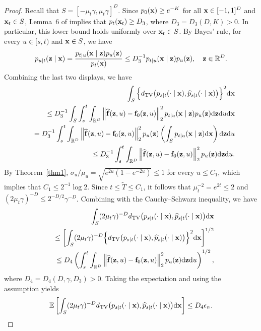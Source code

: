 \documentclass[11pt,a4paper,final]{article}
\numberwithin{equation}{section}
\theoremstyle{remark}
\newcommand{\bff}{{\bf f}}
\newcommand{\bx}{{\bf x}}
\newcommand{\bz}{{\bf z}}
\newcommand{\bbE}{{\mathbb E}}
\newcommand{\bbR}{{\mathbb R}}
\newcommand{\be}{\begin{equation}}
\newcommand{\ee}{\end{equation}}
\newcommand{\bean}{\setlength\arraycolsep{1pt}\begin{eqnarray*}}
\newcommand{\eean}{\end{eqnarray*}}
\def\d{{\rm d}}
\begin{document}
\begin{proof}
Recall that $S = [-\mu_{t}\gamma, \mu_{t} \gamma]^{D}$.
Since $p_{0}(\bx) \geq e^{-K}$ for all $\bx \in [-1,1]^{D}$ and $\bx_{t} \in S$, Lemma~6 of \cite{kwon2026nonparametric} implies that $p_{t}(\bx_{t}) \geq D_{3}$, where $D_{3} = D_{3} ( D, K) > 0$.
In particular, this lower bound holds uniformly over $\bx_{t}\in S$.
By Bayes' rule, for every $u \in [s,t)$ and $\bx \in S$, we have
\bean
p_{u \mid t} (\bz \mid \bx )
= \frac{ p_{ t \mid u} ( \bx \mid \bz) p_{u} (\bz) }{p_{t} (\bx)}
\leq D_{3}^{-1}  p_{ t \mid u} ( \bx \mid \bz) p_{u} (\bz) ,
\quad \bz \in \bbR^{D}.
\eean
Combining the last two displays, we have
\bean
&& \int_{S}  \Big\{ d_{\rm TV} \big( p_{ s \mid t}(\cdot \mid \bx), \widehat p_{ s \mid t}(\cdot \mid \bx) \big) \Big\}^2 \d \bx
\\
&& \leq  D_{3}^{-1} \int_{S} \int_{s}^{t} \int_{\bbR^{D}}  \left\| \widehat \bff (\bz,u) - \bff_0 (\bz, u) \right\|_2^2 p_{t \mid u}(\bx \mid \bz ) p_{u} (\bz) \d \bz \d u \d \bx
\\
&& = D_{3}^{-1}\int_{s}^{t} \int_{\bbR^{D}}  \left\| \widehat \bff (\bz,u) - \bff_0 (\bz, u) \right\|_2^2  p_{u} (\bz)  \left( \int_{S} p_{t \mid u}(\bx \mid \bz ) \d \bx \right)   \d \bz \d u 
\\
&& \leq D_{3}^{-1}  \int_{s}^{t} \int_{\bbR^{D}}  \left\| \widehat \bff (\bz,u) - \bff_0 (\bz, u) \right\|_2^2  p_{u} (\bz) \d \bz \d u.
\eean
By Theorem~\ref{thm1}, $\sigma_{u}/\mu_{u} = \sqrt{e^{2u}(1-e^{-2u})} \leq 1$ for every $u \leq C_{1}$, which implies that $C_{1} \leq 2^{-1} \log 2$.
Since $t \leq {\widetilde T} \leq C_{1}$, it follows that $\mu_{t}^{-2} = e^{2t} \leq 2$ and $(2\mu_{t}\gamma)^{-D} \leq 2^{-D/2}\gamma^{-D}$.
Combining with the Cauchy--Schwarz inequality, we have
\bean
&& \int_{S} (2\mu_{t} \gamma )^{-D}  d_{\rm TV} \big( p_{ s \mid t}(\cdot \mid \bx), \widehat p_{ s \mid t}(\cdot \mid \bx) \big)  \d \bx
\\
&& \leq \left[ \int_{S} (2\mu_{t} \gamma )^{-D} \Big\{ d_{\rm TV} \big( p_{ s \mid t}(\cdot \mid \bx), \widehat p_{ s \mid t}(\cdot \mid \bx) \big) \Big\}^2 \d \bx \right]^{1/2}
\\
&& \leq D_{4}
 \left( \int_{s}^{t} \int_{\bbR^{D}}  \left\| \widehat \bff (\bz,u) - \bff_0 (\bz, u) \right\|_2^2  p_{u} (\bz) \d \bz \d u \right)^{1/2},
\eean
where $D_{4} = D_{4} ( D, \gamma, D_{3} ) > 0$.
Taking the expectation and using the assumption yields
\be
\bbE \left[ \int_{S} (2\mu_{t} \gamma )^{-D}  d_{\rm TV} \big( p_{ s \mid t}(\cdot \mid \bx), \widehat p_{ s \mid t}(\cdot \mid \bx) \big)  \d \bx \right]
\leq D_{4} \epsilon_{n} .
\label{eqthm2:tv_bd}
\ee


\end{proof}
\end{document}
